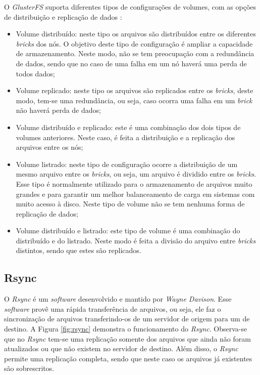 O \textit{GlusterFS} suporta diferentes tipos de configurações de volumes, com as opções de distribuição e replicação de dados \cite{glusterfs}:
\begin{itemize}
 \item Volume distribuído: neste tipo os arquivos são distribuídos entre os diferentes \textit{bricks} dos nós. O objetivo deste tipo de 
 configuração é ampliar a capacidade de armazenamento. Neste modo, não se tem preocupação com a redundância de dados, sendo que no caso de uma
 falha em um nó haverá uma perda de todos dados;
 \item Volume replicado: neste tipo os arquivos são replicados entre os \textit{bricks}, deste modo, tem-se uma redundância, ou seja, caso ocorra
 uma falha em um \textit{brick} não haverá perda de dados;
 \item Volume distribuído e replicado: este é uma combinação dos dois tipos de volumes anteriores. Neste caso, é feita a distribuição 
 e a replicação dos arquivos entre os nós;
 \item Volume listrado: neste tipo de configuração ocorre a distribuição de um mesmo arquivo entre os \textit{bricks}, ou seja, um arquivo é 
 dividido entre os \textit{bricks}. Esse tipo é normalmente utilizado para o armazenamento de arquivos muito grandes e para garantir um melhor 
 balanceamento de carga em sistemas com muito acesso à disco. Neste tipo de volume não se tem nenhuma forma de replicação de dados;
 \item Volume distribuído e listrado: este tipo de volume é uma combinação do distribuído e do listrado. Neste modo é feita a divisão do arquivo 
 entre \textit{bricks} distintos, sendo que estes são replicados.
\end{itemize}

\subsection{Rsync}
\label{section:rsync}
O \textit{Rsync} \cite{rsync} é um \textit{software} desenvolvido e mantido por \textit{Wayne Davison}. Esse \textit{software} provê uma rápida
transferência de arquivos, ou seja, ele faz o sincronização de arquivos transferindo-os de um servidor de origem para um de destino. 
A Figura \ref{fig:rsync} demonstra o funcionamento do \textit{Rsync}. Observa-se que no \textit{Rsync} tem-se uma replicação somente dos 
arquivos que ainda não foram atualizados ou que não existem no servidor de destino. Além disso, o \textit{Rsync} permite uma replicação completa, 
sendo que neste caso os arquivos já existentes são sobrescritos.

